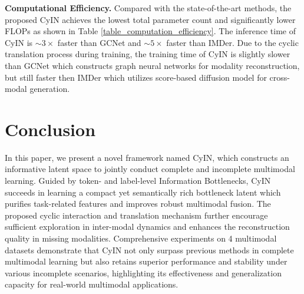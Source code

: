 \documentclass{article}
\begin{document}

\textbf{Computational Efficiency.} 
Compared with the state-of-the-art methods, the proposed CyIN achieves the lowest total parameter count and significantly lower FLOPs as shown in Table \ref{table_computation_efficiency}. The inference time of CyIN is $\sim3\times$ faster than GCNet and $\sim5\times$ faster than IMDer. Due to the cyclic translation process during training, the training time of CyIN is slightly slower than GCNet which constructs graph neural networks for modality reconstruction, but still faster then IMDer which utilizes score-based diffusion model for cross-modal generation.

\begin{table}[thbp]
\centering
\setlength\tabcolsep{7pt}
\caption{Comparion of training and inference computation efficiency on MOSI dataset. }
\vspace{0.1cm}
\label{table_computation_efficiency}
\vspace{-1em}
\end{table}

\section{Conclusion}
In this paper, we present a novel framework named CyIN, which constructs an informative latent space to jointly conduct complete and incomplete multimodal learning. Guided by token- and label-level Information Bottlenecks, CyIN succeeds in learning a compact yet semantically rich bottleneck latent which purifies task-related features and improves robust multimodal fusion. The proposed cyclic interaction and translation mechanism further encourage sufficient exploration in inter-modal dynamics and enhances the reconstruction quality in missing modalities. Comprehensive experiments on 4 multimodal datasets demonstrate that CyIN not only surpass previous methods in complete multimodal learning but also retains superior performance and stability under various incomplete scenarios, highlighting its effectiveness and generalization capacity for real-world multimodal applications.
\end{document}

